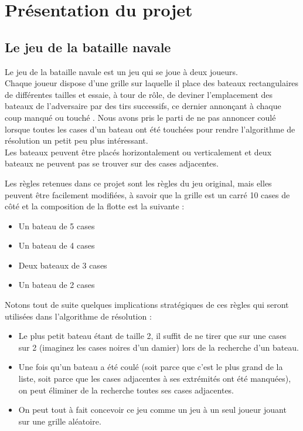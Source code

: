 \chapter{Présentation du projet}

\section{Le jeu de la bataille navale}
Le jeu de la bataille navale est un jeu qui se joue à deux joueurs.\\
Chaque joueur dispose d'une grille sur laquelle il place des bateaux rectangulaires de différentes tailles et essaie, à tour de rôle, de deviner l'emplacement des bateaux de l'adversaire par des tirs successifs, ce dernier annonçant à chaque coup \og manqué \fg{} ou \og touché \fg{}. Nous avons pris le parti de ne pas annoncer \og coulé \fg{} lorsque toutes les cases d'un bateau ont été touchées pour rendre l'algorithme de résolution un petit peu plus intéressant.\\
Les bateaux peuvent être placés horizontalement ou verticalement et deux bateaux ne peuvent pas se trouver sur des cases adjacentes.

Les règles retenues dans ce projet sont les règles du jeu original, mais elles peuvent être facilement modifiées, à savoir que la grille est un carré 10 cases de côté et la composition de la flotte est la suivante :
\begin{itemize}
\item Un bateau de 5 cases
\item Un bateau de 4 cases
\item Deux bateaux de 3 cases
\item Un bateau de 2 cases
\end{itemize}



Notons tout de suite quelques implications stratégiques de ces règles qui seront utilisées dans l'algorithme de résolution :
\begin{itemize}
\item Le plus petit bateau étant de taille 2, il suffit de ne tirer que sur une cases sur 2 (imaginez les cases noires d'un damier) lors de la recherche d'un bateau.
\item Une fois qu'un bateau a été coulé (soit parce que c'est le plus grand de la liste, soit parce que les cases adjacentes à ses extrémités ont été manquées), on peut éliminer de la recherche toutes ses cases adjacentes.
\item On peut tout à fait concevoir ce jeu comme un jeu à un seul joueur jouant sur une grille aléatoire.
\end{itemize}

